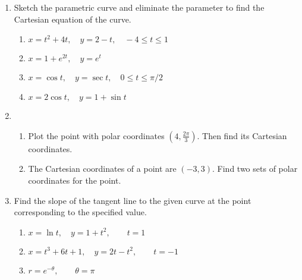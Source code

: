 \begin{enumerate}
\item Sketch the parametric curve and eliminate the parameter to find the Cartesian equation of the curve.\label{prob1}%
\begin{enumerate}
\item \(x = t^2+4t,\quad y=2-t,\quad -4\leq t \leq 1\) \label{prob1a}%
\item \(x =1+e^{2t},\quad y=e^t\) \label{prob1b}%
\item \(x =\cos t,\quad y=\sec t,\quad 0\leq t \leq \pi/2\) \label{prob1c}%
\item \(x =2\cos t,\quad y=1+\sin t\) \label{prob1d}%
\end{enumerate}

\item
\begin{enumerate}
\item Plot the point with polar coordinates \((4, \tfrac{2\pi}{3})\). Then find its Cartesian coordinates. \label{prob2a}%
\item The Cartesian coordinates of a point are \((-3,3)\). Find two sets of polar coordinates for the point.\label{prob2b}%
\end{enumerate}

\item Find the slope of the tangent line to the given curve at the point corresponding to the specified value.
\begin{enumerate}
\item \(x=\ln t, \quad y=1+t^2, \qquad t=1\) \label{prob3a}%
\item \(x=t^3+6t+1, \quad y=2t-t^2, \qquad t=-1\) \label{prob3b} %
\item \(r=e^{-\theta}, \qquad \theta = \pi\) \label{prob3c} %
\end{enumerate}


\end{enumerate}
